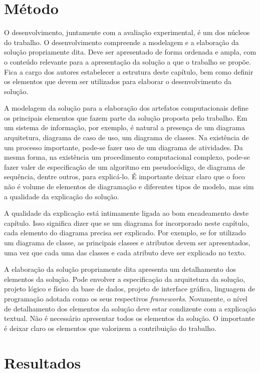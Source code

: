 \documentclass[12pt]{tcc}
\begin{document}
\chapter{Método} 
	\label{sec:metodologia}

O desenvolvimento, juntamente com a avaliação experimental, é um dos núcleos do trabalho. O desenvolvimento compreende a modelagem e a elaboração da solução propriamente dita. Deve ser apresentado de forma ordenada e ampla, com o conteúdo relevante para a apresentação da solução a que o trabalho se propõe. Fica a cargo dos autores estabelecer a estrutura deste capítulo, bem como definir os elementos que devem ser utilizados para elaborar o desenvolvimento da solução. 

A modelagem da solução para a elaboração dos artefatos computacionais define os principais elementos que fazem parte da solução proposta pelo trabalho. Em um sistema de informação, por exemplo, é natural a presença de um diagrama arquitetura, diagrama de caso de uso, um diagrama de classes. Na existência de um processo importante, pode-se fazer uso de um diagrama de atividades. Da mesma forma, na existência um procedimento computacional complexo, pode-se fazer valer de especificação de um algoritmo em pseudocódigo, de diagrama de sequência, dentre outros, para explicá-lo. É importante deixar claro que o foco não é volume de elementos de diagramação e diferentes tipos de modelo, mas sim a qualidade da explicação do solução.

A qualidade da explicação está intimamente ligada ao bom encadeamento deste capítulo. Isso significa dizer que se um diagrama for incorporado neste capítulo, cada elemento do diagrama precisa ser explicado. Por exemplo, se for utilizado um diagrama de classe, as principais classes e atributos devem ser apresentados, uma vez que cada uma das classes e cada atributo deve ser explicado no texto.

A elaboração da solução propriamente dita apresenta um detalhamento dos elementos da solução. Pode envolver a especificação da arquitetura da solução, projeto lógico e físico da base de dados, projeto de interface gráfica, linguagem de programação adotada como os seus respectivos \emph{frameworks}. Novamente, o nível de detalhamento dos elementos da solução deve estar condizente com a explicação textual. Não é necessário apresentar todos os elementos da solução. O importante é deixar claro os elementos que valorizem a contribuição do trabalho.

\chapter{Resultados}
\label{sec:aval_exp}
\end{document}

